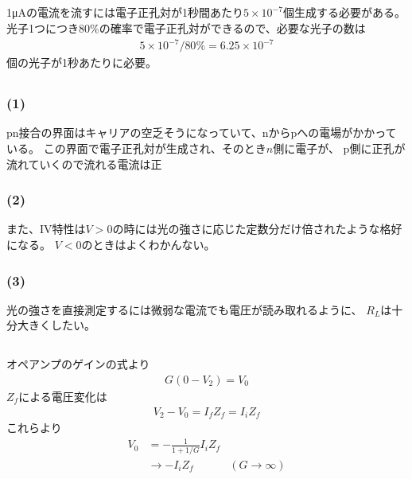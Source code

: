 \documentclass[../../master.tex]{subfiles}
\begin{document}
\subsection{}
1\si{\micro A}の電流を流すには電子正孔対が1秒間あたり\(5\times 10^{-7}\)個生成する必要がある。
光子1つにつき80\%の確率で電子正孔対ができるので、必要な光子の数は
\begin{align}
    5\times10^{-7}/80\% = 6.25 \times 10^{-7}
\end{align}
個の光子が1秒あたりに必要。

\subsection{}
\subsubsection{(1)}
pn接合の界面はキャリアの空乏そうになっていて、nからpへの電場がかかっている。
この界面で電子正孔対が生成され、そのとき\(n\)側に電子が、
p側に正孔が流れていくので流れる電流は正
\subsubsection{(2)}
また、IV特性は\(V>0\)の時には光の強さに応じた定数分だけ倍されたような格好になる。
\(V<0\)のときはよくわかんない。
\subsubsection{(3)}
光の強さを直接測定するには微弱な電流でも電圧が読み取れるように、
\(R_L\)は十分大きくしたい。

\subsection{}
オペアンプのゲインの式より
\begin{align}
    G(0-V_2)=V_0
\end{align}
\(Z_f\)による電圧変化は
\begin{align}
    V_2-V_0 = I_fZ_f = I_i Z_f
\end{align}
これらより
\begin{align}
    V_0 &= -\frac{1}{1+1/G}I_i Z_f\\
    &\to -I_i Z_f &(G\to \infty)
\end{align}
\end{document}
